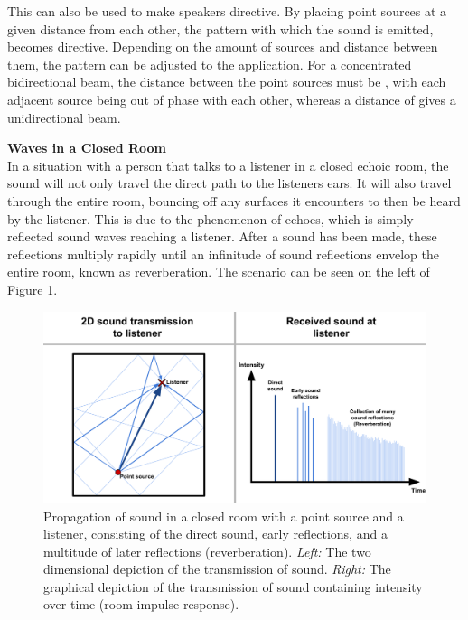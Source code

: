 This can also be used to make speakers directive. By placing point sources at a given distance from each other, the pattern with which the sound is emitted, becomes directive. Depending on the amount of sources and distance between them, the pattern can be adjusted to the application. For a concentrated bidirectional beam, the distance between the point sources must be , with each adjacent source being out of phase with each other, whereas a distance of  gives a unidirectional beam.

\textbf{Waves in a Closed Room}\\
In a situation with a person that talks to a listener in a closed echoic room, the sound will not only travel the direct path to the listeners ears. It will also travel through the entire room, bouncing off any surfaces it encounters to then be heard by the listener. This is due to the phenomenon of echoes, which is simply reflected sound waves reaching a listener. After a sound has been made, these reflections multiply rapidly until an infinitude of sound reflections envelop the entire room, known as reverberation. The scenario can be seen on the left of Figure \ref{fig:direct_early_reverb}.

\begin{figure}[H]
    \centering
    \includegraphics[width=\textwidth]{figures/1Problem_analysis/Reverb_early_direct.pdf}
    \caption{Propagation of sound in a closed room with a point source and a listener, consisting of the direct sound, early reflections, and a multitude of later reflections (reverberation). \textit{Left:} The two dimensional depiction of the transmission of sound. \textit{Right:} The graphical depiction of the transmission of sound containing intensity over time (room impulse response).}
    \label{fig:direct_early_reverb}
\end{figure}

